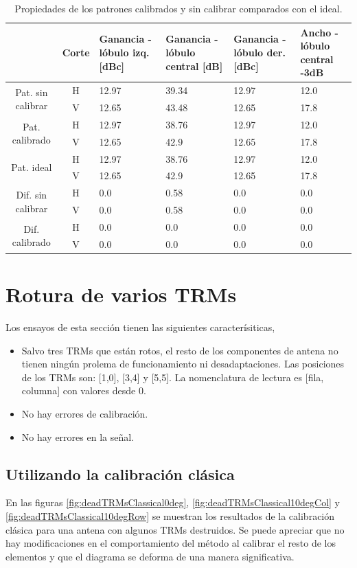 \begin{table}[H]
  \footnotesize
  \centering
  \begin{tabular}{|c|c|p{2cm}|p{2.5cm}|p{2.5cm}|p{2.5cm}|}
    \cline{2-6}
    \multicolumn{1}{c|}{} & Corte & Ganancia - lóbulo izq. [dBc] & Ganancia - lóbulo central [dB] &
    Ganancia - lóbulo der. [dBc] & Ancho - lóbulo central -3dB \tabularnewline\hline
    \multirow{2}{2cm}{Pat. sin calibrar} & H & 12.97 & 39.34 & 12.97 & 12.0 \tabularnewline\cline{2-6}
     & V & 12.65 & 43.48 & 12.65 & 17.8 \tabularnewline\hline
    \multirow{2}{2cm}{Pat. calibrado} & H & 12.97 & 38.76 & 12.97 & 12.0 \tabularnewline\cline{2-6}
     & V & 12.65 & 42.9 & 12.65 & 17.8 \tabularnewline\hline
    \multirow{2}{2cm}{Pat. ideal} & H & 12.97 & 38.76 & 12.97 & 12.0 \tabularnewline\cline{2-6}
     & V & 12.65 & 42.9 & 12.65 & 17.8 \tabularnewline\hline
    \multirow{2}{2cm}{Dif. sin calibrar} & H & 0.0 & 0.58 & 0.0 & 0.0\tabularnewline\cline{2-6}
     & V & 0.0 & 0.58 & 0.0 & 0.0 \tabularnewline\hline
    \multirow{2}{2cm}{Dif. calibrado} & H & 0.0 & 0.0 & 0.0 & 0.0 \tabularnewline\cline{2-6}
     & V & 0.0 & 0.0 & 0.0 & 0.0 \tabularnewline\hline
  \end{tabular}
  \caption{Propiedades de los patrones calibrados y sin calibrar comparados con el ideal.}
  \label{tab:nonErrMutual10degRow}
\end{table}


\section{Rotura de varios TRMs}
Los ensayos de esta sección tienen las siguientes caracterísiticas,
\begin{itemize}
	\item Salvo tres TRMs que están rotos, el resto de los componentes de antena no tienen ningún prolema de funcionamiento ni 
		desadaptaciones. Las posiciones de los TRMs son: [1,0], [3,4] y [5,5]. La nomenclatura de lectura es [fila, columna] con 
		valores desde 0.
	\item No hay errores de calibración.
	\item No hay errores en la señal.
\end{itemize}

\subsection{Utilizando la calibración clásica}
En las figuras \ref{fig:deadTRMsClassical0deg}, \ref{fig:deadTRMsClassical10degCol} y \ref{fig:deadTRMsClassical10degRow} se 
muestran los resultados de la calibración clásica para una antena con algunos TRMs destruidos. Se puede apreciar que no hay 
modificaciones en el comportamiento del método al calibrar el resto de los elementos y que el diagrama se deforma de una manera 
significativa.

